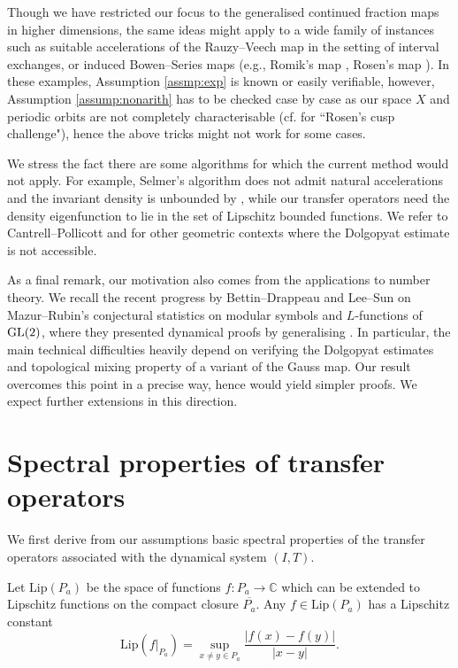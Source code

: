 \documentclass[12pt,a4paper,reqno]{amsart}
\begin{document}
Though we have restricted our focus to the generalised continued fraction maps in higher dimensions, the same ideas might apply to a wide family of instances such as suitable accelerations of the Rauzy--Veech map  in the setting of interval exchanges, or induced Bowen--Series maps (e.g., Romik's map \cite{Romik}, Rosen's map \cite{Rosen}). In these examples, Assumption \ref{assmp:exp} is known or easily verifiable, however, Assumption \ref{assump:nonarith} has to be checked case by case as our space $X$ and periodic orbits are not completely characterisable (cf. \cite{Sch} for ``Rosen's cusp challenge"), hence the above tricks might not work for some cases.

We stress the fact there are some algorithms for which the current method would not apply. For example, Selmer's algorithm does not admit natural accelerations and the invariant density is unbounded  by \cite[Chapter 7]{Schweiger:00}, while our transfer operators need the density  eigenfunction to lie in the  set of Lipschitz bounded functions. We refer to Cantrell--Pollicott \cite{CanPol} and \cite{CanPol2} for other geometric contexts where the Dolgopyat estimate is not accessible. 

As a final remark, our motivation also comes from the applications to number theory. We recall the recent progress by Bettin--Drappeau \cite{BetDra} and Lee--Sun \cite{LeeSun} on Mazur--Rubin's conjectural statistics on modular symbols and $L$-functions of ${\rm GL}(2)$, where they presented dynamical proofs by generalising \cite{baladi-vallee}. In particular, the main technical difficulties heavily depend on verifying the Dolgopyat estimates and topological mixing property of a variant of the Gauss map. Our result overcomes this point in a precise way, hence would yield simpler proofs. We expect further extensions in this direction. 




\section{Spectral properties of transfer operators} \label{sec:dynamics}

We first derive from  our assumptions  basic  spectral properties of  the  transfer operators associated with the dynamical   system $(I,T)$.

Let $\mathrm{Lip}(P_a)$ be the space of functions $f:P_a \rightarrow \mathbb{C}$ which can be extended to Lipschitz functions on the compact closure $\overline{P_a}$. Any $f \in \mathrm{Lip}(P_a)$ has a Lipschitz constant 
\[ \mathrm{Lip}(f|_{P_a})=\sup_{x \neq y \in P_a} \frac{|f(x)-f(y)|}{|x-y|} . \]
\end{document}
